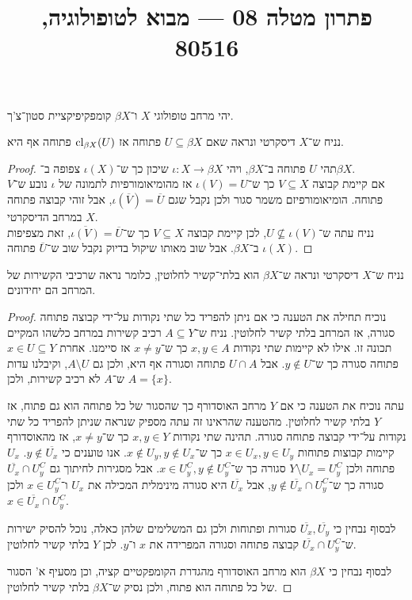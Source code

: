 
\title{פתרון מטלה 08 --- מבוא לטופולוגיה, 80516}


\maketitle
\maketitleprint[purple]

\question{}
יהי מרחב טופולוגי $X$ ו־$\beta X$ קומפקיפיקציית סטון־צ'ך.

\subquestion[2]
נניח ש־$X$ דיסקרטי ונראה שאם $U \subseteq \beta X$ פתוחה אז $\operatorname{cl}_{\beta X}(U)$ פתוחה אף היא.
\begin{proof}
	תהי $U$ פתוחה ב־$\beta X$, ויהי $\iota : X \to \beta X$ שיכון כך ש־$\iota(X)$ צפופה ב־$\beta X$. \\
	אם קיימת קבוצה $V \subseteq X$ כך ש־$\iota(V) = U$ אז מהומיאומורפיות לתמונה של $\iota$ נובע ש־$V$ פתוחה.
	הומיאומורפיזם משמר סגור ולכן נקבל שגם $\iota(\overline{V}) = \overline{U}$, אבל זוהי קבוצה פתוחה במרחב הדיסקרטי $X$. \\
	נניח עתה ש־$U \not\subseteq \iota(V)$, לכן קיימת קבוצה $V \subseteq X$ כך ש־$\overline{\iota(V)} = \overline{U}$, זאת מצפיפות $\iota(X)$ ב־$\beta X$.
	אבל שוב מאותו שיקול בדיוק נקבל שוב ש־$\overline{U}$ פתוחה.
\end{proof}

\subquestion{}
נניח ש־$X$ דיסקרטי ונראה ש־$\beta X$ הוא בלתי־קשיר לחלוטין,
כלומר נראה שרכיבי הקשירות של המרחב הם יחידונים.
\begin{proof}
	נוכיח תחילה את הטענה כי אם ניתן להפריד כל שתי נקודות על־ידי קבוצה פתוחה סגורה, אז המרחב בלתי קשיר לחלוטין.
	נניח ש־$A \subseteq Y$ רכיב קשירות במרחב כלשהו המקיים תכונה זו.
	אילו לא קיימות שתי נקודות $x, y \in A$ כך ש־$x \ne y$ אז סיימנו.
	אחרת $x \in U \subseteq Y$ פתוחה סגורה כך ש־$y \notin U$.
	אבל $U \cap A$ פתוחה וסגורה אף היא, ולכן גם $A \setminus U$, וקיבלנו עדות ש־$A$ לא רכיב קשירות, ולכן $A = \{ x \}$.

	עתה נוכיח את הטענה כי אם $Y$ מרחב האוסדורף כך שהסגור של כל פתוחה הוא גם פתוח, אז $Y$ בלתי קשיר לחלוטין.
	מהטענה שהראינו זה עתה מספיק שנראה שניתן להפריד כל שתי נקודות על־ידי קבוצה פתוחה סגורה.
	תהינה שתי נקודות $x, y \in Y$ כך ש־$x \ne y$, אז מהאוסדורף קיימות קבוצות פתוחות $x \in U_x, y \in U_y$ כך ש־$x \notin U_y, y \notin U_x$.
	אנו טוענים כי $y \notin \overline{U_x}$.
	$U_x$ פתוחה ולכן $Y \setminus U_x = U_y^C$ סגורה כך ש־$x \in U_y^C, y \notin U_y^C$.
	אבל מסגירות לחיתוך גם $\overline{U_x} \cap U_y^C$ סגורה כך ש־$y \notin \overline{U_x} \cap U_y^C$, אבל $\overline{U_x}$ היא סגורה מינימלית המכילה את $U_x$ ו־$x \in U_y^C$ ולכן $x \in \overline{U_x} \cap U_y^C$.

	לבסוף נבחין כי $\overline{U_x}, \overline{U_y}$ סגורות ופתוחות ולכן גם המשלימים שלהן כאלה, נוכל להסיק ישירות ש־$\overline{U_x} \cap U_y^C$ קבוצה פתוחה וסגורה המפרידה את $x$ ו־$y$.
	לכן $Y$ בלתי קשיר לחלוטין.

	לבסוף נבחין כי $\beta X$ הוא מרחב האוסדורף מהגדרת הקומפקטיים קציה, וכן מסעיף א' הסגור של כל פתוחה הוא פתוח, ולכן נסיק ש־$\beta X$ בלתי קשיר לחלוטין.
\end{proof}

